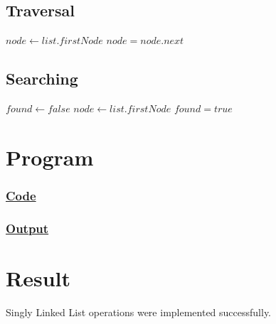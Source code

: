 \subsection{Traversal}

{\Large\color{white}
\begin{algorithmic}[1]
		\State $node \gets list.firstNode$
			\State {}
			\State $node = node.next$
		\EndWhile
	\EndFunction
\end{algorithmic}
\color{black}}

\subsection{Searching}

{\Large\color{white}
\begin{algorithmic}[1]
		\State $found \gets false$
		\State $node \gets list.firstNode$
				\State $found = true$
			\EndIf
		\EndWhile
		\State {}
	\EndFunction
\end{algorithmic}
\color{black}}

\section{Program}

\subsubsection{\underline{Code}}



\subsubsection{\underline{Output}}



\vfill

\section{Result}
{\Large\color{white}
Singly Linked List operations were implemented successfully.
\color{black}}

\clearpage
